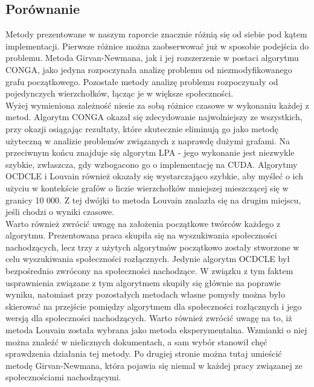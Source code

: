 \documentclass{article}
\begin{document}
\subsection{Porównanie}
Metody prezentowane w naszym raporcie znacznie różnią się od siebie pod kątem implementacji. Pierwsze różnice można zaobserwować już w sposobie podejścia do problemu. Metoda Girvan-Newmana, jak i jej rozszerzenie w postaci algorytmu CONGA, jako jedyna rozpoczynała analizę problemu od niezmodyfikowanego grafu początkowego. Pozostałe metody analizę problemu rozpoczynały od pojedynczych wierzchołków, łącząc je w większe społeczności.\\

Wyżej wymieniona zależność niesie za sobą różnice czasowe w wykonaniu każdej z metod. Algorytm CONGA okazał się zdecydowanie najwolniejszy ze wszystkich, przy okazji osiągając rezultaty, które skutecznie eliminują go jako metodę użyteczną w analizie problemów związanych z naprawdę dużymi grafami. Na przeciwnym końcu znajduje się algorytm LPA - jego wykonanie jest niezwykle szybkie, zwłaszcza, gdy wzbogacono go o implementację na CUDA. Algorytmy OCDCLE i Louvain również okazały się wystarczająco szybkie, aby myśleć o ich użyciu w kontekście grafów o liczie wierzchołków mniejszej mieszczącej się w granicy 10 000. Z tej dwójki to metoda Louvain znalazła się na drugim miejscu, jeśli chodzi o wyniki czasowe. \\

Warto również zwrócić uwagę na założenia początkowe twórców każdego z algorytmu. Prezentowana praca skupiła się na wyszukiwania społeczności nachodzących, lecz trzy z użytych algorytmów początkowo zostały stworzone w celu wyszukiwania społeczności rozłącznych. Jedynie algorytm OCDCLE był bezpośrednio zwrócony na społeczności nachodzące. W związku z tym faktem usprawnienia związane z tym algorytmem skupiły się głównie na poprawie wyniku, natomiast przy pozostałych metodach własne pomysły można było skierować na przejście pomiędzy algorytmem dla społeczności rozłącznych i jego wersją dla społeczności nachodzących. Warto również zwrócić uwagę na to, iż metoda Louvain została wybrana jako metoda eksperymentalna. Wzmianki o niej można znaleźć w nielicznych dokumentach, a sam wybór stanowił chęć sprawdzenia działania tej metody. Po drugiej stronie można tutaj umieścić metodę Girvan-Newmana, która pojawia się niemal w każdej pracy związanej ze społecznościami nachodzącymi. \\
\end{document}
